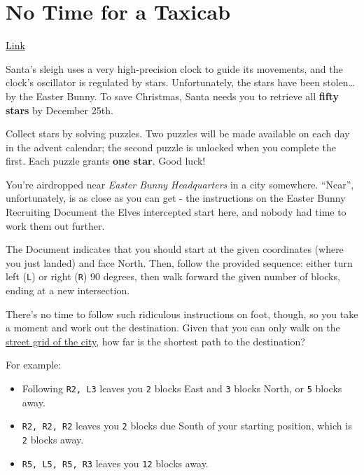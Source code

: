 \chapter{No Time for a Taxicab}\label{no-time-for-a-taxicab}

\href{https://adventofcode.com/2016/day/1}{Link}

Santa's sleigh uses a very high-precision clock to guide its movements,
and the clock's oscillator is regulated by stars. Unfortunately, the
stars have been stolen\ldots{} by the Easter Bunny. To save Christmas,
Santa needs you to retrieve all \textbf{fifty stars} by December 25th.

Collect stars by solving puzzles. Two puzzles will be made available on
each day in the advent calendar; the second puzzle is unlocked when you
complete the first. Each puzzle grants \textbf{one star}. Good luck!

You're airdropped near \emph{Easter Bunny Headquarters} in a city
somewhere. ``Near'', unfortunately, is as close as you can get - the
instructions on the Easter Bunny Recruiting Document the Elves
intercepted start here, and nobody had time to work them out further.

The Document indicates that you should start at the given coordinates
(where you just landed) and face North. Then, follow the provided
sequence: either turn left (\texttt{L}) or right
(\texttt{R}) 90 degrees, then walk forward the given number
of blocks, ending at a new intersection.

There's no time to follow such ridiculous instructions on foot, though,
so you take a moment and work out the destination. Given that you can
only walk on the
\href{https://en.wikipedia.org/wiki/Taxicab_geometry}{street grid of the
city}, how far is the shortest path to the destination?

For example:

\begin{itemize}
\tightlist
\item
  Following \texttt{R2, L3} leaves you
  \texttt{2} blocks East and \texttt{3} blocks
  North, or \texttt{5} blocks away.
\item
  \texttt{R2, R2, R2} leaves you \texttt{2}
  blocks due South of your starting position, which is
  \texttt{2} blocks away.
\item
  \texttt{R5, L5, R5, R3} leaves you
  \texttt{12} blocks away.
\end{itemize}


